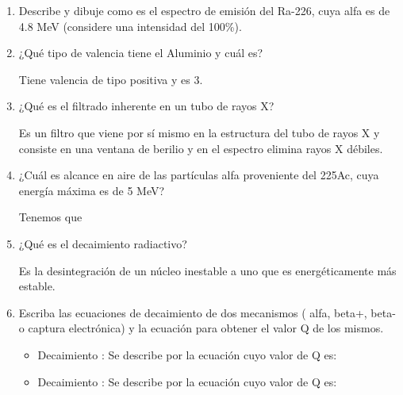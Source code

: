\begin{enumerate}

  \item  Describe y dibuje como es el espectro de emisión del Ra-226, cuya alfa es de 4.8 MeV (considere una intensidad del 100\%).
  


  \item  ¿Qué tipo de valencia tiene el Aluminio y cuál es?
  
Tiene valencia de tipo positiva y es 3.


  \item  ¿Qué es el filtrado inherente en un tubo de rayos X?
  
Es un filtro que viene por sí mismo en la estructura del tubo de rayos X y consiste en una ventana de berilio y en el espectro elimina rayos X débiles.



  \item  ¿Cuál es alcance en aire de las partículas alfa proveniente del 225Ac, cuya energía máxima es de 5 MeV?
  
Tenemos que 



  \item  ¿Qué es el decaimiento radiactivo?
  
  Es la desintegración de un núcleo inestable a uno que es energéticamente más estable.


  \item  Escriba las ecuaciones de decaimiento de dos mecanismos ( alfa, beta+, beta- o captura electrónica) y la ecuación para obtener el valor Q de los mismos.
  

\begin{itemize}
  \item Decaimiento \ec{\alpha}:
  Se describe por la ecuación 
  cuyo valor de Q es:
  \item Decaimiento \ec{\beta+}:
  Se describe por la ecuación
  cuyo valor de Q es:

\end{itemize}



\end{enumerate}
